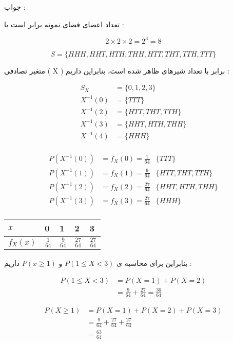 \documentclass[12pt]{book}
\begin{document}
جواب : 

تعداد اعضای فضای نمونه برابر است با :

$$
2 \times 2 \times 2 = 2^{3} = 8
$$

$$
S = \{ HHH , HHT, HTH, THH, HTT, THT, TTH , TTT \}
$$

متغیر تصادفی ( X ) برابر با تعداد شیرهای ظاهر شده است، بنابراین داریم :

\begin{align*}
S_{X} &= \{ 0, 1, 2, 3 \} \\
X^{-1}(0) &= \{ TTT \} \\
X^{-1}(2) &= \{ HTT, THT, TTH \} \\
X^{-1}(3) &= \{ HHT, HTH, THH \} \\
X^{-1}(4) &= \{ HHH \} \\
\end{align*}


\begin{align*}
P(X^{-1}(0)) &= f_{X}(0) = \frac{1}{64} & \{ TTT \}  \\
P(X^{-1}(1)) &= f_{X}(1) = \frac{9}{64} &  \{ HTT, THT, TTH \} \\
P(X^{-1}(2)) &= f_{X}(2) = \frac{27}{64} & \{ HHT, HTH, THH \} \\
P(X^{-1}(3)) &= f_{X}(3) = \frac{27}{64} & \{ HHH \} \\
\end{align*}



\begin{center}
\begin{latin}
\begin{tabular}{ l |  l  l  l  l }
  $x$ & 0 & 1 & 2 & 3  \\
  \hline
  $f_{X}(x)$ & $\frac{1}{64}$ & $\frac{9}{64}$ & $\frac{27}{64}$  & $\frac{27}{64}$ \\
\end{tabular}
\end{latin}
\end{center}



بنابراین برای محاسبه ی 
$P(1 \leq X < 3)$
و
$P(x \geq 1)$
داریم :

\begin{align*}
P(1 \leq X < 3) &= P( X = 1 ) + P( X = 2 ) \\
&= \frac{9}{64} + \frac{27}{64} = \frac{36}{64} 
\end{align*}


\begin{align*}
P(X \geq 1) &= P( X = 1 ) + P( X = 2 ) + P( X = 3 ) \\
&= \frac{9}{64} + \frac{27}{64}+ \frac{27}{64} \\
&= \frac{63}{64} 
\end{align*}
\end{document}
